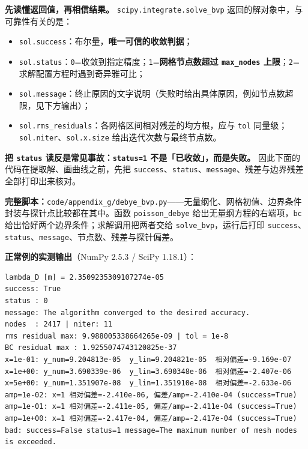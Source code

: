\documentclass[12pt,a4paper,openany,oneside]{book}
\begin{document}
\textbf{先读懂返回值，再相信结果。} \texttt{scipy.integrate.solve\_bvp} 返回的解对象中，与可靠性有关的是：
\begin{itemize}
    \item \texttt{sol.success}：布尔量，\textbf{唯一可信的收敛判据}；
    \item \texttt{sol.status}：\texttt{0}=收敛到指定精度；\texttt{1}=\textbf{网格节点数超过 \texttt{max\_nodes} 上限}；\texttt{2}=求解配置方程时遇到奇异雅可比；
    \item \texttt{sol.message}：终止原因的文字说明（失败时给出具体原因，例如节点数超限，见下方输出）；
    \item \texttt{sol.rms\_residuals}：各网格区间相对残差的均方根，应与 \texttt{tol} 同量级；\texttt{sol.niter}、\texttt{sol.x.size} 给出迭代次数与最终节点数。
\end{itemize}
\textbf{把 \texttt{status} 读反是常见事故：\texttt{status=1} 不是「已收敛」，而是失败。} 因此下面的代码在提取解、画曲线之前，先把 \texttt{success}、\texttt{status}、\texttt{message}、残差与边界残差全部打印出来核对。

\noindent\textbf{完整脚本：}\texttt{code/\allowbreak{}appendix\_g/\allowbreak{}debye\_bvp.py}——无量纲化、网格初值、边界条件封装与探针点比较都在其中。函数 \texttt{poisson\_debye} 给出无量纲方程的右端项，\texttt{bc} 给出恰好两个边界条件；求解调用把两者交给 \texttt{solve\_bvp}，运行后打印 \texttt{success}、\texttt{status}、\texttt{message}、节点数、残差与探针偏差。


\textbf{正常例的实测输出}（NumPy 2.5.3 / SciPy 1.18.1）：
\begin{Verbatim}[breaklines=true,breakanywhere=false,breaksymbolright=\tiny\ensuremath{\hookrightarrow},fontsize=\small]
lambda_D [m] = 2.3509235309107274e-05
success: True
status : 0
message: The algorithm converged to the desired accuracy.
nodes  : 2417 | niter: 11
rms residual max: 9.988005338664265e-09 | tol = 1e-8
BC residual max : 1.9255074743120825e-37
x=1e-01: y_num=9.204813e-05  y_lin=9.204821e-05  相对偏差=-9.169e-07
x=1e+00: y_num=3.690339e-06  y_lin=3.690348e-06  相对偏差=-2.407e-06
x=5e+00: y_num=1.351907e-08  y_lin=1.351910e-08  相对偏差=-2.633e-06
amp=1e-02: x=1 相对偏差=-2.410e-06, 偏差/amp=-2.410e-04 (success=True)
amp=1e-01: x=1 相对偏差=-2.411e-05, 偏差/amp=-2.411e-04 (success=True)
amp=1e+00: x=1 相对偏差=-2.417e-04, 偏差/amp=-2.417e-04 (success=True)
bad: success=False status=1 message=The maximum number of mesh nodes is exceeded.
\end{Verbatim}
\end{document}
